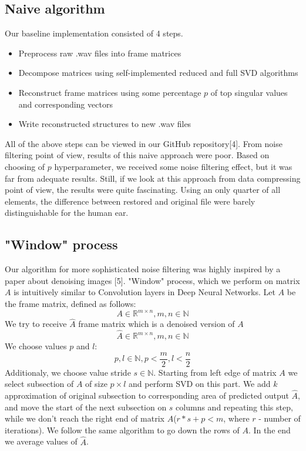 \subsection{Naive algorithm}
Our baseline implementation consisted of 4 steps.
\begin{itemize}
	\item Preprocess raw .wav files into frame matrices
	\item Decompose matrices using self-implemented reduced and full SVD algorithms
	\item Reconstruct frame matrices using some percentage $p$ of top singular values and corresponding vectors
	\item Write reconstructed structures to new .wav files
\end{itemize}
All of the above steps can be viewed in our GitHub repository[4].
From noise filtering point of view, results of this naive approach were poor. Based on choosing of $p$ hyperparameter, we received some noise filtering effect, but it was far from adequate results. 
\newline
Still, if we look at this approach from data compressing point of view, the results were quite fascinating. Using an only quarter of all elements, the difference between restored and original file were barely distinguishable for the human ear.
\subsection{"Window" process}
Our algorithm for more sophisticated noise filtering was highly inspired by a paper about denoising images [5]. "Window" process, which we perform on matrix $A$ is intuitively similar to Convolution layers in Deep Neural Networks.
\newline
Let $A$ be the frame matrix, defined as follows:
\[
A \in \mathbb{R}^{m \times n}, m,n \in \mathbb{N}
\]
We try to receive $\hat{A}$ frame matrix which is a denoised version of $A$
\[
\hat{A} \in \mathbb{R}^{m \times n}, m,n \in \mathbb{N}
\]
We choose values $p$ and $l$:
\[
	 p,l \in \mathbb{N}, p < \frac{m}{2}, l < \frac{n}{2}
\]
 Additionaly, we choose value stride $s \in \mathbb{N} $.
 \newline
 Starting from left edge of matrix $A$ we select subsection of $A$ of size $p \times l$ and perform SVD on this part. We add $k$ approximation of original subsection to corresponding area of predicted output $\hat{A}$, and move the start of the next subsection on $s$ columns and repeating this step, while we don't reach the right end of matrix $A$($r * s + p < m$, where $r$ - number of iterations). We follow the same algorithm to go down the rows of $A$. In the end we average values of $\hat{A}$.
